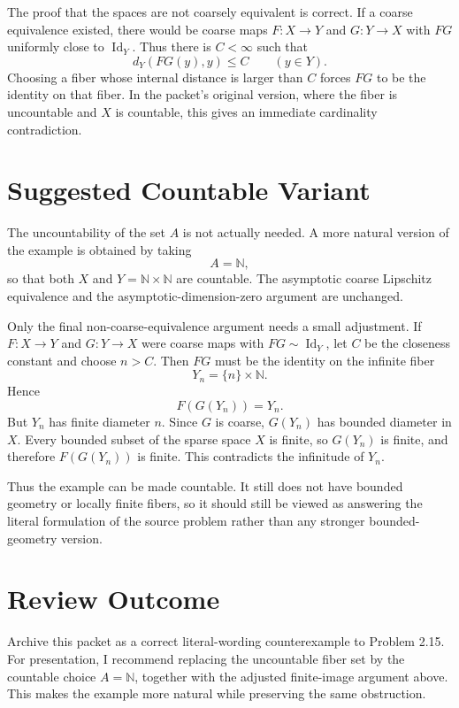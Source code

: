 ﻿\documentclass[11pt]{article}
\begin{document}
The proof that the spaces are not coarsely equivalent is correct.  If a coarse
equivalence existed, there would be coarse maps \(F:X\to Y\) and \(G:Y\to X\)
with \(FG\) uniformly close to \(\operatorname{Id}_Y\).  Thus there is
\(C<\infty\) such that
\[
  d_Y(FG(y),y)\le C\qquad(y\in Y).
\]
Choosing a fiber whose internal distance is larger than \(C\) forces
\(FG\) to be the identity on that fiber.  In the packet's original version,
where the fiber is uncountable and \(X\) is countable, this gives an immediate
cardinality contradiction.

\section*{Suggested Countable Variant}

The uncountability of the set \(A\) is not actually needed.  A more natural
version of the example is obtained by taking
\[
  A=\mathbb N,
\]
so that both \(X\) and \(Y=\mathbb N\times\mathbb N\) are countable.  The
asymptotic coarse Lipschitz equivalence and the asymptotic-dimension-zero
argument are unchanged.

Only the final non-coarse-equivalence argument needs a small adjustment.  If
\(F:X\to Y\) and \(G:Y\to X\) were coarse maps with
\(FG\sim\operatorname{Id}_Y\), let \(C\) be the closeness constant and choose
\(n>C\).  Then \(FG\) must be the identity on the infinite fiber
\[
  Y_n=\{n\}\times\mathbb N.
\]
Hence
\[
  F(G(Y_n))=Y_n.
\]
But \(Y_n\) has finite diameter \(n\).  Since \(G\) is coarse, \(G(Y_n)\) has
bounded diameter in \(X\).  Every bounded subset of the sparse space \(X\) is
finite, so \(G(Y_n)\) is finite, and therefore \(F(G(Y_n))\) is finite.  This
contradicts the infinitude of \(Y_n\).

Thus the example can be made countable.  It still does not have bounded
geometry or locally finite fibers, so it should still be viewed as answering the
literal formulation of the source problem rather than any stronger bounded-
geometry version.

\section*{Review Outcome}

Archive this packet as a correct literal-wording counterexample to Problem 2.15.
For presentation, I recommend replacing the uncountable fiber set by the
countable choice \(A=\mathbb N\), together with the adjusted finite-image
argument above.  This makes the example more natural while preserving the same
obstruction.
\end{document}
